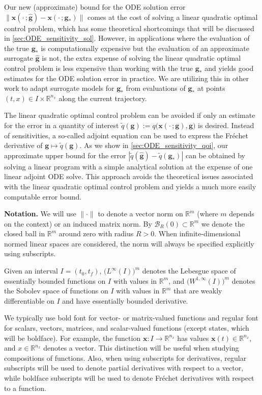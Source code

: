 \documentclass[onefignum,onetabnum]{siamart220329}
\numberwithin{equation}{section}
\newcommand {\real} {\mathbb{R}}
\newcommand{\bg}{\ensuremath{\mathbf{g}}} %
\newcommand{\bx}{\ensuremath{\mathbf{x}}} %
\begin{document}
Our new (approximate) bound for the ODE solution error $\| \bx(\cdot \, ; \widehat{\bg}) - \bx(\cdot \, ; \bg_*) \|$
comes at the cost of solving a linear quadratic optimal control problem, which has some theoretical shortcomings that will be discussed in \cref{sec:ODE_sensitivity_sol}.
However, in applications where the evaluation of the true $\bg_*$ is computationally expensive
but the evaluation of an approximate surrogate  $\widehat{\bg}$ is not, the extra expense of solving the  
linear quadratic optimal control problem is less expensive than working with the true $\bg_*$ and
yields good estimates for the ODE solution error in practice.
We are utilizing this in other work to adapt surrogate models for $\bg_*$ from evaluations of  $\bg_*$ at
points $(t, x) \in I \times \real^{n_x}$ along the current trajectory.

The linear quadratic optimal control problem can be avoided if only an estimate for the error in a
quantity of interest $\widetilde{q}(\bg) :=  q \big(\bx(\cdot \, ; \bg), \bg \big)$ is desired. Instead of sensitivities,
a so-called adjoint equation can be used to express the Fr\'echet derivative of $\bg \mapsto \widetilde{q}(\bg)$.
As we show in \cref{sec:ODE_sensitivity_qoi},  our approximate upper bound for the error $| \widetilde{q}(\widehat{\bg}) - \widetilde{q}(\bg_*) |$ can be obtained by solving a linear program with a simple analytical solution at the expense of one linear adjoint ODE solve. This approach avoids the theoretical issues associated with the linear quadratic optimal control problem and yields a much more easily computable error bound.


{\bf Notation.} 
We will use $\| \cdot \|$ to denote a vector norm on $\real^m$ (where $m$ depends on the context) or an 
induced matrix norm.
By $\mathcal{B}_R(0) \subset \real^m$ we denote the closed ball in $\real^m$ around zero with radius $R>0$.
When infinite-dimensional normed linear spaces are considered, the norm will always be specified explicitly 
using subscripts.

Given an interval $I = (t_0, t_f)$,  $\big( L^\infty(I) \big)^m$ denotes the Lebesgue space of essentially bounded functions on $I$ with
values in $\real^m$, and $\big( W^{1, \infty}(I) \big)^m$ denotes the Sobolev space of functions on $I$ with 
values in $\real^m$ that are weakly differentiable on $I$ and have essentially bounded derivative.

We typically use bold font for vector- or matrix-valued functions and regular font for scalars, vectors, matrices, and scalar-valued functions (except states, which will be boldface). For example, the function $\bx: I \rightarrow \real^{n_x}$ has values $\bx(t) \in \real^{n_x}$, and $x \in \real^{n_x}$ denotes a vector. This distinction will be useful when
studying compositions of functions. Also, when using subscripts for derivatives, regular subscripts will be used to denote partial derivatives with respect to a vector, while boldface subscripts will be used to denote Fr\'echet derivatives with respect to a function.
\end{document}
